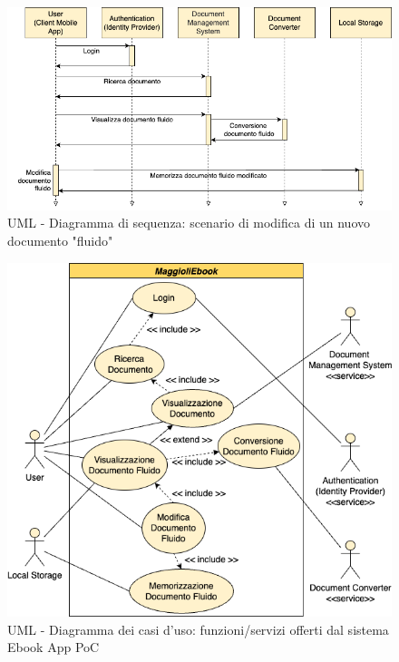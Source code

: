 \begin{figure}[H]
\centering
\includegraphics[width=1\textwidth]{img/tesi-2-Use-case2.drawio.png}
\caption{UML - Diagramma di sequenza: scenario di modifica di un nuovo documento "fluido"}
\end{figure}

\begin{figure}[H]
\centering
\includegraphics[width=1\textwidth]{img/tesi-1-Use-case.drawio.png}
\caption{UML - Diagramma dei casi d'uso: funzioni/servizi offerti dal sistema Ebook App PoC}
\end{figure}

